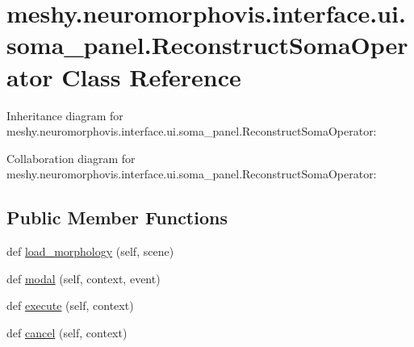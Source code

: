 \hypertarget{classmeshy_1_1neuromorphovis_1_1interface_1_1ui_1_1soma__panel_1_1ReconstructSomaOperator}{}\section{meshy.\+neuromorphovis.\+interface.\+ui.\+soma\+\_\+panel.\+Reconstruct\+Soma\+Operator Class Reference}
\label{classmeshy_1_1neuromorphovis_1_1interface_1_1ui_1_1soma__panel_1_1ReconstructSomaOperator}


Inheritance diagram for meshy.\+neuromorphovis.\+interface.\+ui.\+soma\+\_\+panel.\+Reconstruct\+Soma\+Operator\+:


Collaboration diagram for meshy.\+neuromorphovis.\+interface.\+ui.\+soma\+\_\+panel.\+Reconstruct\+Soma\+Operator\+:
\subsection*{Public Member Functions}
\begin{DoxyCompactItemize}
\item 
def \hyperlink{classmeshy_1_1neuromorphovis_1_1interface_1_1ui_1_1soma__panel_1_1ReconstructSomaOperator_a08cad97d5f185edf743187fb90559ad6}{load\+\_\+morphology} (self, scene)
\item 
def \hyperlink{classmeshy_1_1neuromorphovis_1_1interface_1_1ui_1_1soma__panel_1_1ReconstructSomaOperator_a4b0e2381549838187f6cdf9eeccd6600}{modal} (self, context, event)
\item 
def \hyperlink{classmeshy_1_1neuromorphovis_1_1interface_1_1ui_1_1soma__panel_1_1ReconstructSomaOperator_a69502d64db47969ba8c120e2bc103ba3}{execute} (self, context)
\item 
def \hyperlink{classmeshy_1_1neuromorphovis_1_1interface_1_1ui_1_1soma__panel_1_1ReconstructSomaOperator_a4c7e281249977333071655bc1a937a21}{cancel} (self, context)
\end{DoxyCompactItemize}
